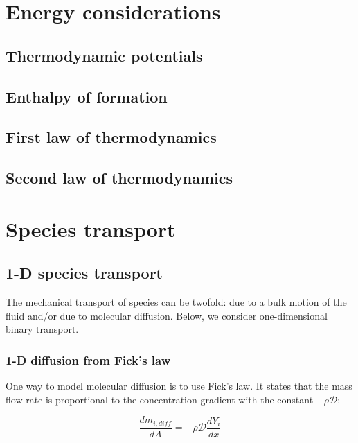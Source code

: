 \documentclass[10pt,twocolumn]{article}
\begin{document}
\section{Energy considerations}


\subsection{Thermodynamic potentials}





\subsection{Enthalpy of formation}


\subsection{First law of thermodynamics}


\subsection{Second law of thermodynamics}



\section{Species transport}



\subsection{1-D species transport}

The mechanical transport of species can be twofold: due to a bulk motion of the fluid and/or due to molecular diffusion. Below, we consider one-dimensional binary transport.

\subsubsection{1-D diffusion from Fick's law}

One way to model molecular diffusion is to use Fick's law. It states that the mass flow rate is proportional to the concentration gradient with the constant $-\rho \mathcal{D}$:

\begin{equation}
\frac{d \dot{m}_{i, diff}}{dA} = - \rho \mathcal{D} \frac{d Y_i}{dx}
\end{equation}
\end{document}
